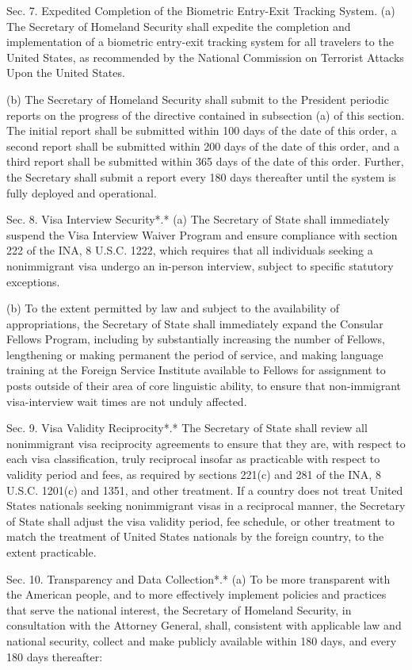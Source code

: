 Sec. 7. Expedited Completion of the Biometric Entry-Exit Tracking
System. (a) The Secretary of Homeland Security shall expedite the
completion and implementation of a biometric entry-exit tracking system
for all travelers to the United States, as recommended by the National
Commission on Terrorist Attacks Upon the United States.

(b) The Secretary of Homeland Security shall submit to the President
periodic reports on the progress of the directive contained in
subsection (a) of this section. The initial report shall be submitted
within 100 days of the date of this order, a second report shall be
submitted within 200 days of the date of this order, and a third report
shall be submitted within 365 days of the date of this order. Further,
the Secretary shall submit a report every 180 days thereafter until the
system is fully deployed and operational.

Sec. 8. Visa Interview Security*.* (a) The Secretary of State shall
immediately suspend the Visa Interview Waiver Program and ensure
compliance with section 222 of the INA, 8 U.S.C. 1222, which requires
that all individuals seeking a nonimmigrant visa undergo an in-person
interview, subject to specific statutory exceptions.

(b) To the extent permitted by law and subject to the availability of
appropriations, the Secretary of State shall immediately expand the
Consular Fellows Program, including by substantially increasing the
number of Fellows, lengthening or making permanent the period of
service, and making language training at the Foreign Service Institute
available to Fellows for assignment to posts outside of their area of
core linguistic ability, to ensure that non-immigrant visa-interview
wait times are not unduly affected.

Sec. 9. Visa Validity Reciprocity*.* The Secretary of State shall review
all nonimmigrant visa reciprocity agreements to ensure that they are,
with respect to each visa classification, truly reciprocal insofar as
practicable with respect to validity period and fees, as required by
sections 221(c) and 281 of the INA, 8 U.S.C. 1201(c) and 1351, and other
treatment. If a country does not treat United States nationals seeking
nonimmigrant visas in a reciprocal manner, the Secretary of State shall
adjust the visa validity period, fee schedule, or other treatment to
match the treatment of United States nationals by the foreign country,
to the extent practicable.

Sec. 10. Transparency and Data Collection*.* (a) To be more transparent
with the American people, and to more effectively implement policies and
practices that serve the national interest, the Secretary of Homeland
Security, in consultation with the Attorney General, shall, consistent
with applicable law and national security, collect and make publicly
available within 180 days, and every 180 days thereafter:

